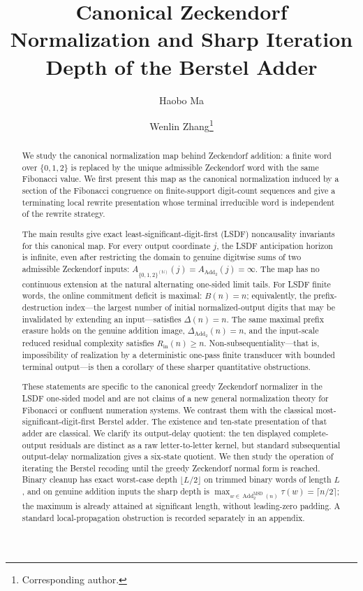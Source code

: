 \documentclass[11pt,letterpaper]{article}
\title{Canonical Zeckendorf Normalization and Sharp Iteration Depth of the Berstel Adder}
\author[1]{Haobo Ma}
\author[2]{Wenlin Zhang\thanks{Corresponding author.}}
\affil[1]{AELF PTE LTD., \#14-02, Marina Bay Financial Centre Tower 1, 8 Marina Blvd, Singapore 018981, Singapore\\\texttt{auric@aelf.io}}
\affil[2]{National University of Singapore, Singapore\\\texttt{e1327962@u.nus.edu}}
\date{}
\numberwithin{equation}{section}
\theoremstyle{plain}
\theoremstyle{definition}
\theoremstyle{remark}
\begin{document}
\maketitle

\begin{abstract}
We study the canonical normalization map behind Zeckendorf addition: a finite
word over $\{0,1,2\}$ is replaced by the unique admissible Zeckendorf word
with the same Fibonacci value.  We first present this map as the canonical
normalization induced by a section of the Fibonacci congruence on
finite-support digit-count sequences
and give a terminating local rewrite presentation whose terminal irreducible
word is independent of the rewrite strategy.

The main results give exact least-significant-digit-first (LSDF)
noncausality invariants for this canonical map.  For every output coordinate
$j$, the LSDF anticipation horizon is infinite, even after restricting the
domain to genuine digitwise sums of two admissible Zeckendorf inputs:
$A_{\{0,1,2\}^{(\mathbb N)}}(j)=A_{\operatorname{Add}_2}(j)=\infty$.  The
map has no continuous extension at the natural alternating one-sided limit
tails.  For LSDF finite words, the online commitment deficit is maximal:
$B(n)=n$; equivalently, the prefix-destruction index---the largest number of
initial normalized-output digits that may be invalidated by extending an
input---satisfies $\Delta(n)=n$.  The same maximal prefix erasure holds on the genuine addition
image, $\Delta_{\operatorname{Add}_2}(n)=n$, and the input-scale reduced
residual complexity satisfies $R_{\mathrm{in}}(n)\ge n$.
Non-subsequentiality---that is, impossibility of realization by a
deterministic one-pass finite transducer with bounded terminal output---is
then a corollary of these sharper quantitative obstructions.

These statements are specific to the canonical greedy Zeckendorf normalizer
in the LSDF one-sided model and are not claims of a new general normalization
theory for Fibonacci or confluent numeration systems.  We contrast them with
the classical most-significant-digit-first Berstel adder.  The existence and
ten-state presentation of that adder are classical.  We clarify its
output-delay quotient: the ten displayed complete-output residuals are
distinct as a raw letter-to-letter kernel, but standard subsequential
output-delay normalization gives a six-state quotient.  We then study the
operation of iterating the Berstel recoding until the greedy Zeckendorf normal
form is reached.  Binary cleanup has exact worst-case depth
$\lfloor L/2\rfloor$ on trimmed binary words of length $L$, and on genuine
addition inputs the sharp depth is
$\max_{w\in\operatorname{Add}_2^{\mathrm{MSD}}(n)}\tau(w)=\lceil n/2\rceil$;
the maximum is already attained at significant length, without leading-zero
padding.  A standard local-propagation obstruction is recorded separately in an
appendix.
\end{abstract}
\end{document}
